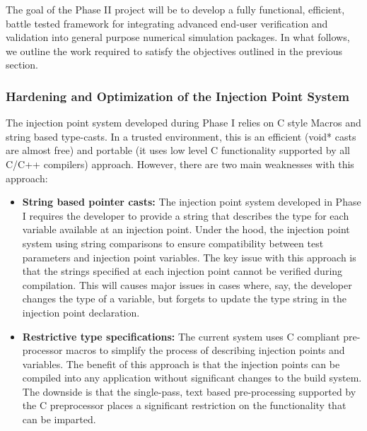 The goal of the Phase II project will be to develop a fully functional, efficient, battle tested framework 
for integrating advanced end-user verification and validation into general purpose numerical simulation packages. In what follows, we outline
the work required to satisfy the objectives outlined in the previous section. 

\subsubsection{Hardening and Optimization of the Injection Point System}

The injection point system developed during Phase I relies on C style Macros and string based type-casts. In a trusted environment, this is an efficient (void* casts are almost free) and portable (it uses low level C functionality supported by all C/C++ compilers) approach. However, there are two main weaknesses with this approach:

\begin{itemize}
 \item {\bf String based pointer casts:} The injection point system developed in Phase I requires the developer to provide a string that describes the type for each variable available at an injection point. Under the hood, the injection point system using string comparisons to ensure compatibility between test parameters and injection point variables. The key issue with this approach is that the strings specified at each injection point cannot be verified during compilation.  This will causes major issues in cases where, say, the developer changes the type of a variable, but forgets to update the type string in the injection point declaration.  
  
 \item {\bf Restrictive type specifications:} The current system uses C compliant pre-processor macros to simplify the process of describing injection points and variables. The benefit of this approach is that the injection points can be compiled into any application without significant changes to the build system. The downside is that the single-pass, text based pre-processing supported by the C preprocessor places a significant restriction on the functionality that can be imparted.
 
\end{itemize}
 
